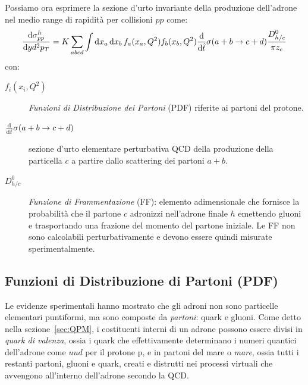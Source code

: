     Possiamo ora esprimere la sezione d'urto invariante della produzione dell'adrone nel medio range di rapidità per collisioni $pp$ come:
    \begin{equation*}
        \dv{\sigma_{pp}^h}{y d^2 p_{T}} = K \sum_{abcd}{\int{\dd{x_a} \dd{x_b} f_{a}(x_a,Q^2) f_{b}(x_b,Q^2) \dv{\hat{t}} \sigma(a + b \to c + d) \frac{D_{{h}/{c}}^0}{\pi z_c}}}
    \end{equation*}
    con:
    \begin{description}
        \item[$f_i(x_i,Q^2)$] \textit{Funzioni di Distribuzione dei Partoni} (PDF) riferite ai partoni del protone.

        \item[$\dv{\hat{t}} \sigma(a + b \to c + d)$] sezione d'urto elementare perturbativa QCD della produzione della particella $c$ a partire dallo scattering dei partoni $a + b$.

        \item[$D_{{h}/{c}}^0$] \textit{Funzione di Frammentazione} (FF): elemento adimensionale che fornisce la probabilità che il partone $c$ adronizzi nell'adrone finale $h$ emettendo gluoni e trasportando una frazione del momento del partone iniziale. Le FF non sono calcolabili perturbativamente e devono essere quindi misurate sperimentalmente.
    \end{description}

    \subsection{Funzioni di Distribuzione di Partoni (PDF)}
    \label{sec:PDF}
        Le evidenze sperimentali hanno mostrato che gli adroni non sono particelle elementari puntiformi, ma sono composte da \textit{partoni}: quark e gluoni. Come detto nella sezione~\ref{sec:QPM}, i costituenti interni di un adrone possono essere divisi in \textit{quark di valenza}, ossia i quark che effettivamente determinano i numeri quantici dell'adrone come $uud$ per il protone p, e in partoni del mare o \textit{mare}, ossia tutti i restanti partoni, gluoni e quark, creati e distrutti nei processi virtuali che avvengono all'interno dell'adrone secondo la QCD.

